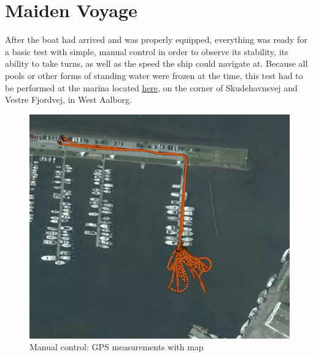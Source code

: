 \chapter{Maiden Voyage}

After the boat had arrived and was properly equipped, everything was ready for a basic test with simple, manual control in order to observe its stability, its ability to take turns, as well as the speed the ship could navigate at. Because all pools or other forms of standing water were frozen at the time, this test had to be performed at the marina located \href{https://maps.google.com/?ll=57.058301,9.896772&spn=0.003495,0.009645&t=h&z=17""}{here}, on the corner of Skudehavnsvej and Vestre Fjordvej, in West Aalborg. 

\begin{figure}[htpb]
	\centering
	\includegraphics[width=\textwidth]{img/maidenVoyage/pointsOnMap}
	\caption{Manual control: GPS measurements with map} 
	\label{fig:pointsOnMap}
	\end{figure}

